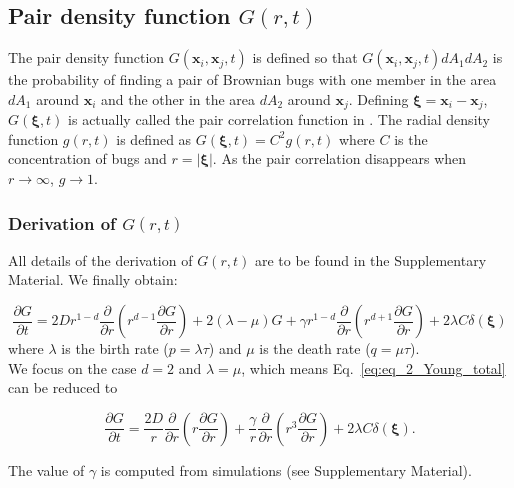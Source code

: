 \subsection*{Pair density function $G(r,t)$}

The pair density function $G(\boldsymbol{x}_i,\boldsymbol{x}_j,t)$ is defined so that $G(\boldsymbol{x}_i,\boldsymbol{x}_j,t)dA_1dA_2$ is the probability of finding a pair of Brownian bugs with one member in the area $dA_1$ around $\boldsymbol{x}_i$ and the other in the area $dA_2$ around $\boldsymbol{x}_j$. Defining $\boldsymbol{\xi}=\boldsymbol{x}_i-\boldsymbol{x}_j$,  $G(\boldsymbol{\xi},t)$ is actually called the pair correlation function in \cite{young_reproductive_2001}. The radial density function $g(r,t)$ is defined as $G(\boldsymbol{\xi},t)=C^2g(r,t)$ where $C$ is the concentration of bugs and $r=|\boldsymbol{\xi}|$. As the pair correlation disappears when $r\rightarrow\infty$, $g\rightarrow 1$. \\

\subsubsection*{Derivation of $G(r,t)$}

All details of the derivation of $G(r,t)$ are to be found in the Supplementary Material. We finally obtain:

\begin{equation}
\frac{\partial G}{\partial t}=2Dr^{1-d}\frac{\partial}{\partial r}\left(r^{d-1}\frac{\partial G}{\partial r}\right)+2(\lambda-\mu)G+\gamma r^{1-d}\frac{\partial}{\partial r}\left(r^{d+1}\frac{\partial G}{\partial r}\right)+2\lambda C\delta(\boldsymbol{\xi})\label{eq:eq_2_Young_total}
\end{equation}
where $\lambda$ is the birth rate ($p=\lambda\tau$) and $\mu$ is the death rate ($q=\mu\tau$). \\

We focus on the case $d=2$ and $\lambda=\mu$, which means Eq.~\ref{eq:eq_2_Young_total} can be reduced to

\begin{equation}
\frac{\partial G}{\partial t}=\frac{2D}{r}\frac{\partial}{\partial r}\left(r\frac{\partial G}{\partial r}\right)+\frac{\gamma}{r}\frac{\partial}{\partial r}\left(r^{3}\frac{\partial G}{\partial r}\right)+2\lambda C\delta(\boldsymbol{\xi}).\label{eq:eq_2_Young_reduced}
\end{equation}

The value of $\gamma$ is computed from simulations (see Supplementary Material).

